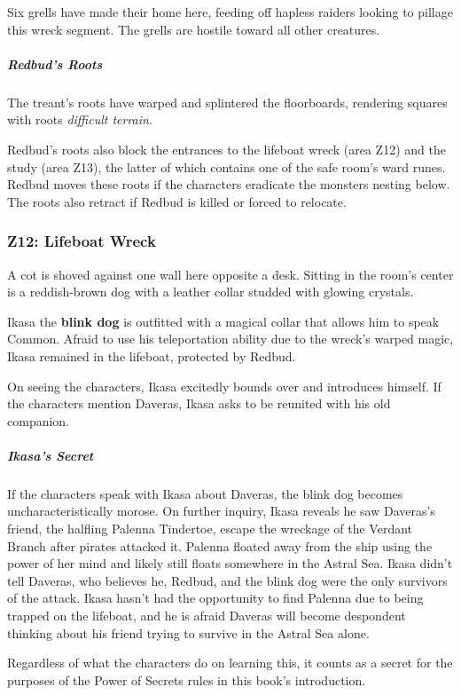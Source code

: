 \documentclass[10pt,a4paper,twoside,bg=print,twocolumn,openany,nodeprecatedcode]{dndbook}
\begin{document}
Six grells have made their home here, feeding off hapless raiders looking to pillage this wreck segment. The grells are hostile toward all other creatures.

\subparagraph{Redbud's Roots}
The treant's roots have warped and splintered the floorboards, rendering squares with roots \textit{difficult terrain}.

Redbud's roots also block the entrances to the lifeboat wreck (area Z12) and the study (area Z13), the latter of which contains one of the safe room's ward runes. Redbud moves these roots if the characters eradicate the monsters nesting below. The roots also retract if Redbud is killed or forced to relocate.

\subsubsection{Z12: Lifeboat Wreck}
\begin{DndReadAloud}{}
A cot is shoved against one wall here opposite a desk. Sitting in the room's center is a reddish-brown dog with a leather collar studded with glowing crystals.

\end{DndReadAloud}

Ikasa the \textbf{blink dog} is outfitted with a magical collar that allows him to speak Common. Afraid to use his teleportation ability due to the wreck's warped magic, Ikasa remained in the lifeboat, protected by Redbud.

On seeing the characters, Ikasa excitedly bounds over and introduces himself. If the characters mention Daveras, Ikasa asks to be reunited with his old companion.

\subparagraph{Ikasa's Secret}
If the characters speak with Ikasa about Daveras, the blink dog becomes uncharacteristically morose. On further inquiry, Ikasa reveals he saw Daveras's friend, the halfling Palenna Tindertoe, escape the wreckage of the Verdant Branch after pirates attacked it. Palenna floated away from the ship using the power of her mind and likely still floats somewhere in the Astral Sea. Ikasa didn't tell Daveras, who believes he, Redbud, and the blink dog were the only survivors of the attack. Ikasa hasn't had the opportunity to find Palenna due to being trapped on the lifeboat, and he is afraid Daveras will become despondent thinking about his friend trying to survive in the Astral Sea alone.

Regardless of what the characters do on learning this, it counts as a secret for the purposes of the Power of Secrets rules in this book's introduction.
\end{document}
